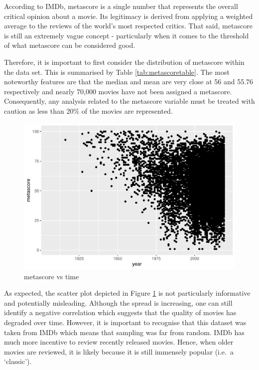 \documentclass[11pt,a4paper,]{article}
\begin{document}
According to IMDb, metascore is a single number that represents the overall critical opinion about a movie. Its legitimacy is derived from applying a weighted average to the reviews of the world's most respected critics. That said, metascore is still an extremely vague concept - particularly when it comes to the threshold of what metascore can be considered good.

Therefore, it is important to first consider the distribution of metascore within the data set. This is summarised by Table \ref{tab:metascoretable}. The most noteworthy features are that the median and mean are very close at 56 and 55.76 respectively and nearly 70,000 movies have not been assigned a metascore. Consequently, any analysis related to the metascore variable must be treated with caution as less than 20\% of the movies are represented.

\begin{figure}
\centering
\includegraphics{Report_files/figure-latex/metascorescatterplot-1.pdf}
\caption{\label{fig:metascorescatterplot}metascore vs time}
\end{figure}

As expected, the scatter plot depicted in Figure \ref{fig:metascorescatterplot} is not particularly informative and potentially misleading. Although the spread is increasing, one can still identify a negative correlation which suggests that the quality of movies has degraded over time. However, it is important to recognise that this dataset was taken from IMDb which means that sampling was far from random. IMDb has much more incentive to review recently released movies. Hence, when older movies are reviewed, it is likely because it is still immensely popular (i.e.~a `classic').
\end{document}
